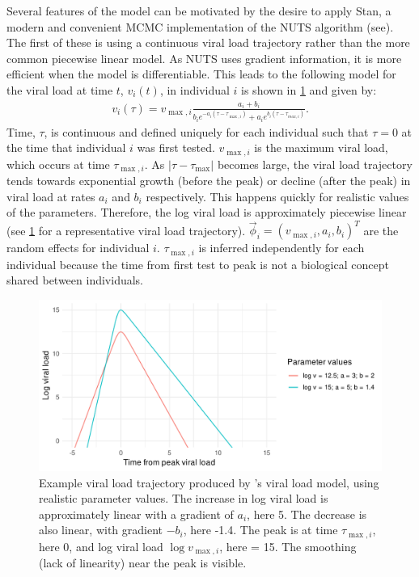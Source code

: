 \documentclass[thesis.tex]{subfiles}
\begin{document}
Several features of the \textcite{hakkiOnset} model can be motivated by the desire to apply Stan, a modern and convenient MCMC implementation of the NUTS algorithm (see).
The first of these is using a continuous viral load trajectory rather than the more common piecewise linear model.
As NUTS uses gradient information, it is more efficient when the model is differentiable.
This leads to the following model for the viral load at time $t$, $v_i(t)$, in individual $i$ is shown in \cref{ATACCC:fig:viral-load-model} and given by:
\begin{align}
v_i(\tau) = v_{\max,i} \frac{a_i+b_i}{b_ie^{-a_i(\tau-\tau_{\max,i})} + a_ie^{b_i(\tau-\tau_{max,i})}}. \label{ATACCC:eq:viral-load}
\end{align}
Time, $\tau$, is continuous and defined uniquely for each individual such that $\tau = 0$ at the time that individual $i$ was first tested.
$v_{\max,i}$ is the maximum viral load, which occurs at time $\tau_{\max,i}$.
As $\lvert \tau - \tau_{\max} \rvert$ becomes large, the viral load trajectory tends towards exponential growth (before the peak) or decline (after the peak) in viral load at rates $a_i$ and $b_i$ respectively.
This happens quickly for realistic values of the parameters.
Therefore, the log viral load is approximately piecewise linear (see \cref{ATACCC:fig:viral-load-model} for a representative viral load trajectory).
$\vec{\phi}_i = (v_{\max,i}, a_i, b_i)^T$ are the random effects for individual $i$.
$\tau_{\max,i}$ is inferred independently for each individual because the time from first test to peak is not a biological concept shared between individuals.
\begin{figure}
  \centering \includegraphics{ATACCC/typical_trajectory}
  \caption[Example viral load model trajectory.]{Example viral load trajectory produced by \textcite{hakkiOnset}'s viral load model, using realistic parameter values. The increase in log viral load is approximately linear with a gradient of $a_i$, here 5. The decrease is also linear, with gradient $-b_i$, here -1.4. The peak is at time $\tau_{\max,i}$, here 0, and log viral load $\log v_{\max,i}$, here = 15. The smoothing (lack of linearity) near the peak is visible. \label{ATACCC:fig:viral-load-model}}
\end{figure}
\end{document}
